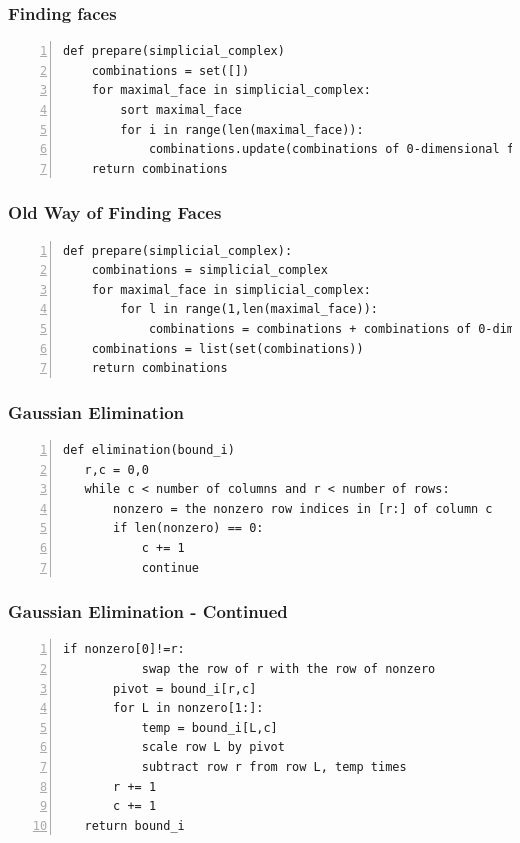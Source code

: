 \documentclass{beamer}
\begin{document}
\begin{frame}[fragile]
\frametitle{Finding faces}
\begin{lstlisting}[numbers=left]
def prepare(simplicial_complex)
    combinations = set([])
    for maximal_face in simplicial_complex:
    	sort maximal_face
        for i in range(len(maximal_face)):
            combinations.update(combinations of 0-dimensional faces in maximal_face of length i)
    return combinations    
\end{lstlisting}
\end{frame}

\begin{frame}[fragile]
\frametitle{Old Way of Finding Faces}
\begin{lstlisting}[numbers=left]
def prepare(simplicial_complex):
    combinations = simplicial_complex
    for maximal_face in simplicial_complex:
        for l in range(1,len(maximal_face)):
            combinations = combinations + combinations of 0-dimensional faces in maximal_face of length l
    combinations = list(set(combinations))
    return combinations
\end{lstlisting}
\end{frame}

\begin{frame}[fragile]
\frametitle{Gaussian Elimination}
\begin{lstlisting}[numbers=left]
def elimination(bound_i)
   r,c = 0,0
   while c < number of columns and r < number of rows:
       nonzero = the nonzero row indices in [r:] of column c
       if len(nonzero) == 0:
           c += 1
           continue
\end{lstlisting}
\end{frame}

\begin{frame}[fragile]
\frametitle{Gaussian Elimination - Continued}
\begin{lstlisting}[numbers=left]
       if nonzero[0]!=r:
           swap the row of r with the row of nonzero
       pivot = bound_i[r,c]
       for L in nonzero[1:]:
           temp = bound_i[L,c]
           scale row L by pivot
           subtract row r from row L, temp times
       r += 1
       c += 1
   return bound_i
\end{lstlisting}
\end{frame}
\end{document}
